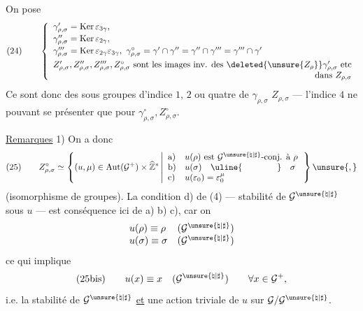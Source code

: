 
On pose
\[
(24)\qquad
\left\{
\begin{array}{l}
\gamma'_{\rho,\sigma}=\operatorname{Ker}\varepsilon_{3\gamma},\\[2pt]
\gamma''_{\rho,\sigma}=\operatorname{Ker}\varepsilon_{2\gamma},\\[2pt]
\gamma'''_{\rho,\sigma}=\operatorname{Ker}\varepsilon_{2\gamma}\varepsilon_{3\gamma},\
\gamma^\circ_{\rho,\sigma}=\gamma'\cap\gamma''=\gamma''\cap\gamma'''
=\gamma'''\cap\gamma'\\[4pt]
Z'_{\rho,\sigma},Z''_{\rho,\sigma},Z'''_{\rho,\sigma},Z^\circ_{\rho,\sigma}
\text{ sont les images inv. des }\deleted{\unsure{Z_\rho}}
\gamma'_{\rho,\sigma}\text{ etc}\\
\hfill\text{dans }Z_{\rho,\sigma}
\end{array}
\right.
\]
Ce sont donc des sous groupes d'indice $1$,  $2$ ou quatre de
$\gamma_{\rho,\sigma}$ \unsure{respt} $Z_{\rho,\sigma}$ --- l'indice $4$ ne pouvant
se présenter que pour $\gamma^\circ_{\rho,\sigma},Z^\circ_{\rho,\sigma}$.

\uline{Remarques} 1) On a donc
\[
(25)\qquad
Z^\circ_{\rho,\sigma}\simeq
\left\{
(u,\mu)\in\operatorname{Aut}(\mathcal{G}^{+})\times\widehat{\mathbb{Z}}^{*}
\left|
\begin{array}{ll}
\mathrm{a})&u(\rho)\text{ est }\mathcal{G}^{\unsure{\natural|\sharp}}\text{-conj. à }\rho\\
\mathrm{b})&u(\sigma)\quad\uline{\hspace{4em}}\quad\sigma\\
\mathrm{c})&u(\varepsilon_0)=\varepsilon_0^\mu
\end{array}
\right.
\right\}\unsure{,}
\]
(isomorphisme de  groupes). La condition d) de (4) ---
stabilité de $\mathcal{G}^{\unsure{\natural|\sharp}}$ sous $u$ --- est conséquence
ici de a) b) c), car on \unsure{aura}
\[
\begin{array}{ll}
u(\rho)\equiv\rho&(\mathcal{G}^{\unsure{\natural|\sharp}})\\
u(\sigma)\equiv\sigma&(\mathcal{G}^{\unsure{\natural|\sharp}})
\end{array}
\]
ce qui implique
\[
(25\mathrm{bis})\qquad
u(x)\equiv x\quad(\mathcal{G}^{\unsure{\natural|\sharp}})
\qquad \forall x\in\mathcal{G}^{+},
\]
i.e. la stabilité de $\mathcal{G}^{\unsure{\natural|\sharp}}$ \uline{et} une action triviale de
$u$ sur $\mathcal{G}/\mathcal{G}^{\unsure{\natural|\sharp}}$.

